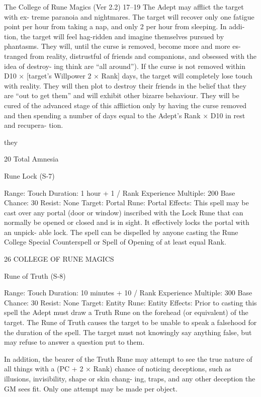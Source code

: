 \begin{Chapter}{The College of Rune Magics (Ver 2.2)}
17–19  The  Adept  may  afflict  the  target  with  ex-
treme  paranoia  and  nightmares.  The  target  will 
recover only one fatigue point per hour from taking 
a nap, and only 2 per hour from sleeping. In addi-
tion,  the  target  will  feel  hag-ridden  and  imagine 
themselves pursued by phantasms. They will, until 
the  curse  is  removed,  become  more  and  more  es-
tranged  from  reality,  distrustful  of  friends  and 
companions, and obsessed with the idea of destroy-
ing 
think  are  “all 
around”). If the curse is not removed within D10 × 
[target’s Willpower 2 × Rank] days, the target will 
completely  lose  touch  with  reality.  They  will  then 
plot  to  destroy  their  friends  in  the  belief  that  they 
are “out to get them” and will exhibit other bizarre 
behaviour.  They  will  be  cured  of  the  advanced 
stage  of  this  affliction  only  by  having  the  curse 
removed and then spending a number of days equal 
to  the  Adept’s  Rank  ×  D10  in  rest  and  recupera-
tion. 

they 

20 Total Amnesia 

Rune Lock (S-7) 

Range: Touch 
Duration: 1 hour + 1 / Rank 
Experience Multiple: 200 
Base Chance: 30%
Resist: None 
Target: Portal  
Rune: Portal 
Effects:  This  spell  may  be  cast  over  any  portal 
(door  or  window)  inscribed  with  the  Lock  Rune 
that  can  normally  be  opened  or  closed  and  is  in 
sight. It effectively locks the portal with an unpick-
able  lock.  The  spell  can  be  dispelled  by  anyone 
casting  the  Rune  College  Special  Counterspell  or 
Spell of Opening of at least equal Rank. 

26 COLLEGE OF RUNE MAGICS 

Rune of Truth (S-8) 

Range: Touch 
Duration: 10 minutes + 10 / Rank 
Experience Multiple: 300 
Base Chance: 30%
Resist: None 
Target: Entity  
Rune: Entity 
Effects:  Prior  to  casting  this  spell  the  Adept  must 
draw a Truth Rune on the forehead (or equivalent) 
of  the  target.  The  Rune  of  Truth  causes  the  target 
to  be  unable  to  speak  a  falsehood  for  the  duration 
of  the  spell.  The  target  must  not  knowingly  say 
anything false, but may refuse to answer a question 
put to them. 

In  addition,  the  bearer  of  the  Truth  Rune  may 
attempt  to  see  the  true  nature  of  all  things  with  a 
(PC  +  2  ×  Rank)  chance  of  noticing  deceptions, 
such as illusions, invisibility, shape or skin chang-
ing, traps, and any other deception the GM sees fit. 
Only one attempt may be made per object. 


\end{Chapter}
